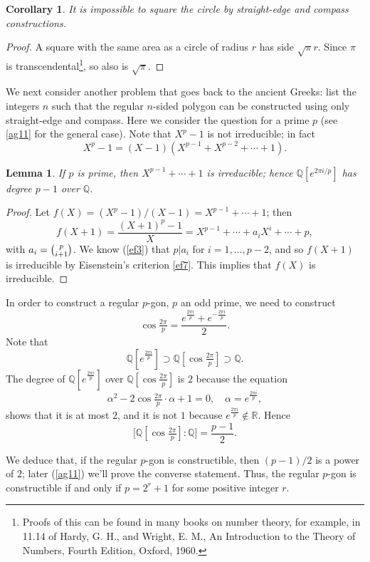 \documentclass[a4paper,11pt,final,openany]{memoir}
\newtheorem{corollary}[X]{Corollary}
\newtheorem{lemma}[X]{Lemma}
\theoremstyle{nonumberplain}
\newtheorem{proof}{Proof.}
\begin{document}
\begin{corollary}
\label{ef30}It is impossible to square the circle by straight-edge and compass constructions.
\end{corollary}

\begin{proof}
A square with the same area as a circle of radius $r$ has side $\sqrt{\pi}r$.
Since $\pi$ is transcendental\footnote{Proofs of this can be found in many
books on number theory, for example, in 11.14 of Hardy, G. H., and Wright, E.
M., An Introduction to the Theory of Numbers, Fourth Edition, Oxford, 1960.},
so also is $\sqrt{\pi}$.
\end{proof}

We next consider another problem that goes back to the ancient Greeks: list
the integers $n$ such that the regular $n$-sided polygon can be constructed
using only straight-edge and compass. Here we consider the question for a
prime $p$ (see \ref{ag11} for the general case). Note that $X^{p}-1$ is not
irreducible; in fact
\[
X^{p}-1=(X-1)(X^{p-1}+X^{p-2}+\cdots+1).
\]


\begin{lemma}
\label{ef31}If $p$ is prime, then $X^{p-1}+\cdots+1$ is irreducible; hence
$\mathbb{Q}[e^{2\pi i/p}]$ has degree $p-1$ over $\mathbb{Q}.$
\end{lemma}

\begin{proof}
Let $f(X)=(X^{p}-1)/(X-1)=X^{p-1}+\cdots+1$; then%
\[
f(X+1)=\frac{(X+1)^{p}-1}{X}=X^{p-1}+\cdots+a_{i}X^{i}+\cdots+p,
\]
with $a_{i}=\tbinom{p}{i+1}$. We know (\ref{ef3}) that $p|a_{i}$ for
$i=1,...,p-2$, and so $f(X+1)$ is irreducible by Eisenstein's criterion
\ref{ef7}. This implies that $f(X)$ is irreducible.
\end{proof}

In order to construct a regular $p$-gon, $p$ an odd prime, we need to
construct
\[
\cos\tfrac{2\pi}{p}=\frac{e^{\frac{2\pi i}{p}}+e^{-\frac{2\pi i}{p}}}{2}.
\]
Note that
\[
\mathbb{Q}[e^{\frac{2\pi i}{p}}]\supset\mathbb{Q}[\cos\tfrac{2\pi}{p}%
]\supset\mathbb{Q}.
\]
The degree of $\mathbb{Q}[e^{\frac{2\pi i}{p}}]$ over $\mathbb{Q}[\cos
\frac{2\pi}{p}]$ is $2$ because the equation
\[
\alpha^{2}-2\cos\tfrac{2\pi}{p}\cdot\alpha+1=0,\quad\alpha=e^{\frac{2\pi i}%
{p}},
\]
shows that it is at most $2$, and it is not $1$ because $e^{\frac{2\pi i}{p}%
}\notin\mathbb{R}{}$. Hence
\[
\lbrack\mathbb{Q}[\cos\tfrac{2\pi}{p}]\colon\mathbb{Q}]=\frac{p-1}{2}.
\]


We deduce that, if the regular $p$-gon is constructible, then $(p-1)/2$ is a
power of $2$; later (\ref{ag11}) we'll prove the converse statement. Thus, the
regular $p$-gon is constructible if and only if $p=2^{r}+1$ for some positive
integer $r$.
\end{document}
